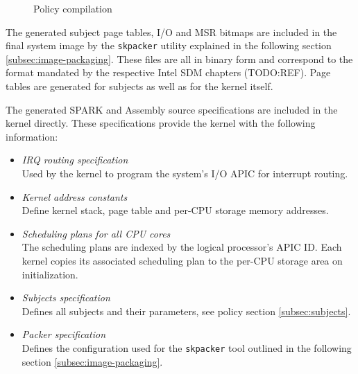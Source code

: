 \begin{figure}[h]
	\centering
	\caption{Policy compilation}
	\label{fig:policy-compilation}
\end{figure}

The generated subject page tables, I/O and MSR bitmaps are included in the final
system image by the \texttt{skpacker} utility explained in the following section
\ref{subsec:image-packaging}. These files are all in binary form and correspond
to the format mandated by the respective Intel SDM chapters (TODO:REF). Page
tables are generated for subjects as well as for the kernel itself.

The generated SPARK and Assembly source specifications are included in the
kernel directly. These specifications provide the kernel with the following
information:

\begin{itemize}
	\item \emph{IRQ routing specification}\\
		Used by the kernel to program the system's I/O APIC for interrupt
		routing.
	\item \emph{Kernel address constants}\\
		Define kernel stack, page table and per-CPU storage memory addresses.
	\item \emph{Scheduling plans for all CPU cores}\\
		The scheduling plans are indexed by the logical processor's APIC ID.
		Each kernel copies its associated scheduling plan to the per-CPU storage
		area on initialization.
	\item \emph{Subjects specification}\\
		Defines all subjects and their parameters, see policy section
		\ref{subsec:subjects}.
	\item \emph{Packer specification}\\
		Defines the configuration used for the \texttt{skpacker} tool outlined
		in the following section \ref{subsec:image-packaging}.
\end{itemize}

